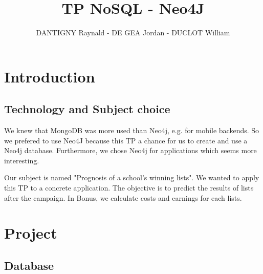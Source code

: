 \documentclass[a4paper,oneside,1pt]{article}
\title{TP NoSQL - Neo4J}
\author{DANTIGNY Raynald - DE GEA Jordan - DUCLOT William}
\begin{document}





\maketitle

\section{Introduction}

\subsection{Technology and Subject choice}

We knew that MongoDB was more used than Neo4j, e.g. for mobile backends. So we prefered to use Neo4J because this TP a chance for us to create and use a Neo4j database.  Furthermore, we chose Neo4j for applications which seems more interesting. 
\linebreak

Our subject is named "Prognosis of a school's winning lists". We wanted to apply this TP to a concrete application. The objective is to predict the results of lists after the campaign. In Bonus, we calculate costs and earnings for each lists. 

\section{Project}

\subsection{Database}

\end{document}
